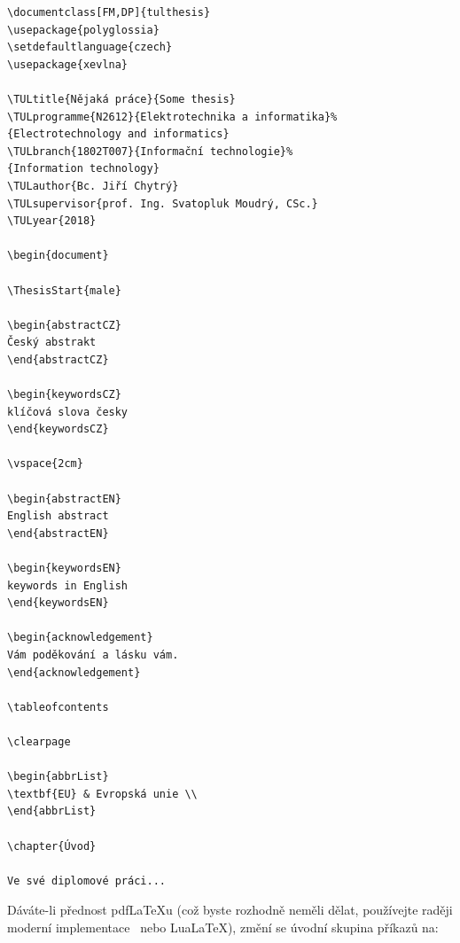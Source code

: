 \documentclass[FZS,DP,EN]{tulthesis}
\newenvironment{myquote}{\begin{list}{}{\setlength\leftmargin\parindent}\item[]}{\end{list}}
\newenvironment{listing}{\begin{myquote}\color{\tulcolor}}{\end{myquote}}
\begin{document}
\begin{listing}
\begin{verbatim}
\documentclass[FM,DP]{tulthesis}
\usepackage{polyglossia}
\setdefaultlanguage{czech}
\usepackage{xevlna}

\TULtitle{Nějaká práce}{Some thesis}
\TULprogramme{N2612}{Elektrotechnika a informatika}%
{Electrotechnology and informatics}
\TULbranch{1802T007}{Informační technologie}%
{Information technology}
\TULauthor{Bc. Jiří Chytrý}
\TULsupervisor{prof. Ing. Svatopluk Moudrý, CSc.}
\TULyear{2018}

\begin{document}

\ThesisStart{male}

\begin{abstractCZ}
Český abstrakt
\end{abstractCZ}

\begin{keywordsCZ}
klíčová slova česky
\end{keywordsCZ}

\vspace{2cm}

\begin{abstractEN}
English abstract
\end{abstractEN}

\begin{keywordsEN}
keywords in English
\end{keywordsEN}

\begin{acknowledgement}
Vám poděkování a lásku vám.
\end{acknowledgement}

\tableofcontents

\clearpage

\begin{abbrList}
\textbf{EU} & Evropská unie \\
\end{abbrList}

\chapter{Úvod}

Ve své diplomové práci...
\end{verbatim}
\end{listing}

Dáváte-li přednost pdf\LaTeX u (což byste rozhodně neměli dělat, používejte raději
moderní implementace \XeLaTeX\ nebo Lua\LaTeX), změní se úvodní skupina příkazů na:
\end{document}
